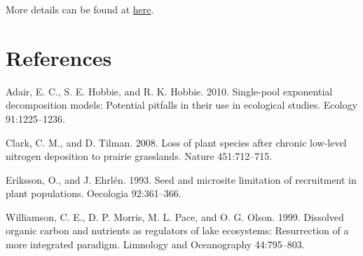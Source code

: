 \documentclass[12pt,]{article}
\begin{document}
More details can be found at
\href{https://bookdown.org/yihui/bookdown/}{here}.

\hypertarget{references}{%
\section*{References}\label{references}}

\hypertarget{refs}{}
\leavevmode\hypertarget{ref-adair_single-pool_2010}{}%
Adair, E. C., S. E. Hobbie, and R. K. Hobbie. 2010. Single-pool
exponential decomposition models: Potential pitfalls in their use in
ecological studies. Ecology 91:1225--1236.

\leavevmode\hypertarget{ref-clark_loss_2008}{}%
Clark, C. M., and D. Tilman. 2008. Loss of plant species after chronic
low-level nitrogen deposition to prairie grasslands. Nature
451:712--715.

\leavevmode\hypertarget{ref-eriksson_seed_1993}{}%
Eriksson, O., and J. Ehrlén. 1993. Seed and microsite limitation of
recruitment in plant populations. Oecologia 92:361--366.

\leavevmode\hypertarget{ref-williamson_dissolved_1999}{}%
Williamson, C. E., D. P. Morris, M. L. Pace, and O. G. Olson. 1999.
Dissolved organic carbon and nutrients as regulators of lake ecosystems:
Resurrection of a more integrated paradigm. Limnology and Oceanography
44:795--803.
\end{document}
